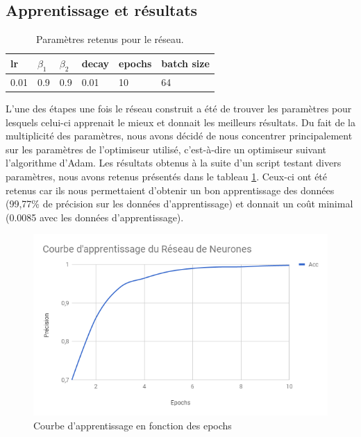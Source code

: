 \subsection{Apprentissage et résultats}

\begin{table}[h!]
	\centering
	\begin{tabular}{|l|l|l|l|l|l|}
		\hline
		\textbf{lr} & \textbf{$\beta_1$} & \textbf{$\beta_2$} & \textbf{decay} & \textbf{epochs} & \textbf{batch size} \\
		\hline
		0.01 & 0.9 & 0.9 & 0.01 & 10 & 64 \\
		\hline
	\end{tabular}
	\caption{Paramètres retenus pour le réseau.}
	\label{tab:saved_params}
\end{table}

\par L'une des étapes une fois le réseau construit a été de trouver les paramètres pour lesquels celui-ci apprenait le mieux et donnait les meilleurs résultats. Du fait de la multiplicité des paramètres, nous avons décidé de nous concentrer principalement sur les paramètres de l'optimiseur utilisé, c'est-à-dire un optimiseur suivant l'algorithme d'Adam. Les résultats obtenus à la suite d'un script testant divers paramètres, nous avons retenus présentés dans le tableau \ref{tab:saved_params}. Ceux-ci ont été retenus car ils nous permettaient d'obtenir un bon apprentissage des données (99,77\% de précision sur les données d'apprentissage) et donnait un coût minimal (0.0085 avec les données d'apprentissage).

\begin{figure}
	\centering
	\includegraphics[scale=0.75]{./img/learn_nn_chart.png}
	\caption{Courbe d'apprentissage en fonction des epochs}
	\label{fig:nn_app}
\end{figure}

